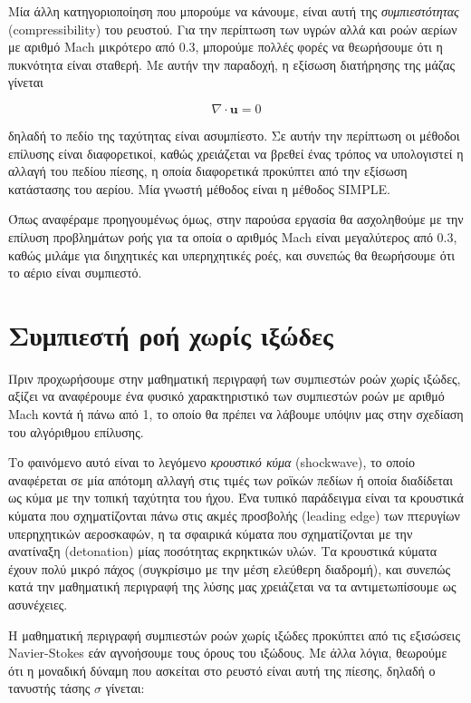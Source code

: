 Μία άλλη κατηγοριοποίηση που μπορούμε να κάνουμε, είναι αυτή της \emph{συμπιεστότητας} (compressibility) του ρευστού.
Για την περίπτωση των υγρών αλλά και ροών αερίων με αριθμό Mach μικρότερο από 0.3, μπορούμε πολλές φορές να θεωρήσουμε ότι η πυκνότητα είναι σταθερή.
Με αυτήν την παραδοχή, η εξίσωση διατήρησης της μάζας γίνεται

\begin{equation*}
    \nabla \cdot \mathbf{u} = 0
\end{equation*}

δηλαδή το πεδίο της ταχύτητας είναι ασυμπίεστο.
Σε αυτήν την περίπτωση οι μέθοδοι επίλυσης είναι διαφορετικοί, καθώς χρειάζεται να βρεθεί ένας τρόπος να υπολογιστεί η αλλαγή του πεδίου πίεσης, η οποία διαφορετικά προκύπτει από την εξίσωση κατάστασης του αερίου.
Μία γνωστή μέθοδος είναι η μέθοδος SIMPLE.

Όπως αναφέραμε προηγουμένως όμως, στην παρούσα εργασία θα ασχοληθούμε με την επίλυση προβλημάτων ροής για τα οποία ο αριθμός Mach είναι μεγαλύτερος από 0.3, καθώς μιλάμε για διηχητικές και υπερηχητικές ροές, και συνεπώς θα θεωρήσουμε ότι το αέριο είναι συμπιεστό.

\section{Συμπιεστή ροή χωρίς ιξώδες}

Πριν προχωρήσουμε στην μαθηματική περιγραφή των συμπιεστών ροών χωρίς ιξώδες, αξίζει να αναφέρουμε ένα φυσικό χαρακτηριστικό των συμπιεστών ροών με αριθμό Mach κοντά ή πάνω από 1, το οποίο θα πρέπει να λάβουμε υπόψιν μας στην σχεδίαση του αλγόριθμου επίλυσης.

Το φαινόμενο αυτό είναι το λεγόμενο \emph{κρουστικό κύμα} (shockwave), το οποίο αναφέρεται σε μία απότομη αλλαγή στις τιμές των ροϊκών πεδίων ή οποία διαδίδεται ως κύμα με την τοπική ταχύτητα του ήχου.
Ένα τυπικό παράδειγμα είναι τα κρουστικά κύματα που σχηματίζονται πάνω στις ακμές προσβολής (leading edge) των πτερυγίων υπερηχητικών αεροσκαφών, η τα σφαιρικά κύματα που σχηματίζονται με την ανατίναξη (detonation) μίας ποσότητας εκρηκτικών υλών.
Τα κρουστικά κύματα έχουν πολύ μικρό πάχος (συγκρίσιμο με την μέση ελεύθερη διαδρομή), και συνεπώς κατά την μαθηματική περιγραφή της λύσης μας χρειάζεται να τα αντιμετωπίσουμε ως ασυνέχειες.

Η μαθηματική περιγραφή συμπιεστών ροών χωρίς ιξώδες προκύπτει από τις εξισώσεις Navier-Stokes εάν αγνοήσουμε τους όρους του ιξώδους.
Με άλλα λόγια, θεωρούμε ότι η μοναδική δύναμη που ασκείται στο ρευστό είναι αυτή της πίεσης, δηλαδή ο τανυστής τάσης $\sigma$ γίνεται:

